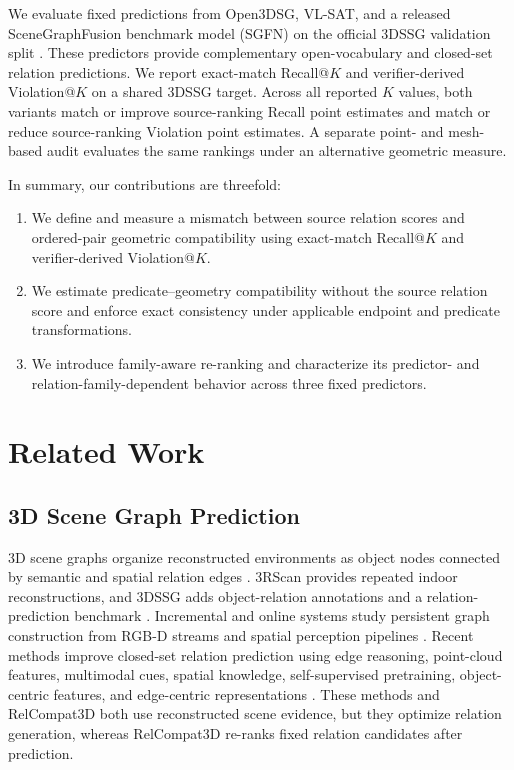 We evaluate fixed predictions from Open3DSG, VL-SAT, and a released SceneGraphFusion benchmark model (SGFN) on the official 3DSSG validation split \cite{wang2023vl,koch2024open3dsg,wu2021scenegraphfusion}. These predictors provide complementary open-vocabulary and closed-set relation predictions. We report exact-match Recall@$K$ and verifier-derived Violation@$K$ on a shared 3DSSG target. Across all reported $K$ values, both variants match or improve source-ranking Recall point estimates and match or reduce source-ranking Violation point estimates. A separate point- and mesh-based audit evaluates the same rankings under an alternative geometric measure. 

In summary, our contributions are threefold:
\begin{enumerate}
    \item We define and measure a mismatch between source relation scores and ordered-pair geometric compatibility using exact-match Recall@$K$ and verifier-derived Violation@$K$.
    \item We estimate predicate--geometry compatibility without the source relation score and enforce exact consistency under applicable endpoint and predicate transformations.
    \item We introduce family-aware re-ranking and characterize its predictor- and relation-family-dependent behavior across three fixed predictors.
\end{enumerate}


\section{Related Work}
\subsection{3D Scene Graph Prediction}
3D scene graphs organize reconstructed environments as object nodes connected by semantic and spatial relation edges \cite{armeni20193d}.
3RScan provides repeated indoor reconstructions, and 3DSSG adds object-relation annotations and a relation-prediction benchmark \cite{wald2019rio,wald2020learning}. Incremental and online systems study persistent graph construction from RGB-D streams and spatial perception pipelines \cite{wu2021scenegraphfusion,hughes2022hydra}. Recent methods improve closed-set relation prediction using edge reasoning, point-cloud features, multimodal cues, spatial knowledge, self-supervised pretraining, object-centric features, and edge-centric representations \cite{zhang2021exploiting,feng20233d,wang2023vl,koch2024sgrec3d,heo2026object,ma2026edge}. These methods and RelCompat3D both use reconstructed scene evidence, but they optimize relation generation, whereas RelCompat3D re-ranks fixed relation candidates after prediction.

